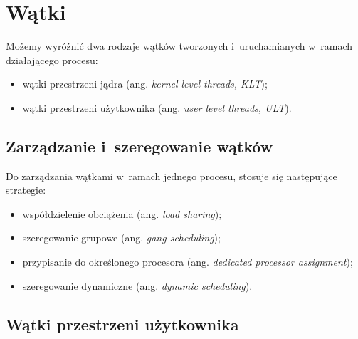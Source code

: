 \documentclass[11pt,makeidx]{mwart}
\begin{document}
\section{Wątki}
\label{sec:threads}
\indent
	Możemy wyróżnić dwa rodzaje wątków tworzonych i~uruchamianych w~ramach działającego procesu:
	\begin{itemize}
		\item wątki przestrzeni jądra (ang. \emph{kernel level threads, KLT});
		\item wątki przestrzeni użytkownika (ang. \emph{user level threads, ULT}).
	\end{itemize}
\par
%
\subsection{Zarządzanie i~szeregowanie wątków}
%
\indent
	Do zarządzania wątkami w~ramach jednego procesu, stosuje się następujące strategie:
	\begin{itemize}
		\item współdzielenie obciążenia (ang. \emph{load sharing});
		\item szeregowanie grupowe (ang. \emph{gang scheduling});
		\item przypisanie do określonego procesora (ang. \emph{dedicated processor assignment});
		\item szeregowanie dynamiczne (ang. \emph{dynamic scheduling}).
	\end{itemize}
\par
%
\subsection{Wątki przestrzeni użytkownika}
%
\newpage
\end{document}

